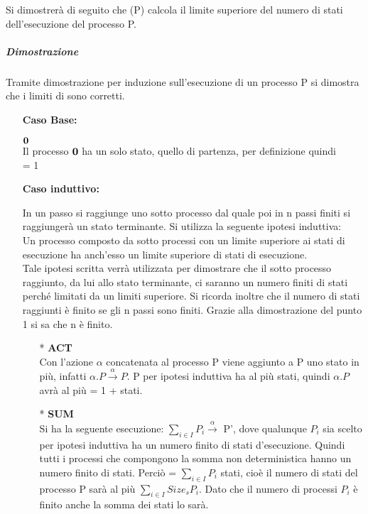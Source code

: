 Si dimostrerà di seguito che \sis(P) calcola il limite superiore del numero di stati dell'esecuzione del processo P.

\subparagraph{Dimostrazione} \mbox{}

Tramite dimostrazione per induzione sull'esecuzione di un processo P si dimostra che i limiti di  sono corretti.

\begin{itemize}
	\item[] \textbf{Caso Base:} \mbox{}
	
	 $\mathbf{0}$
	\\
	Il processo $\mathbf{0}$ ha un solo stato, quello di partenza, per definizione quindi\\ \sis{\zero} = 1 
		\\
	\item[] \textbf{Caso induttivo:} \mbox{}
	
	In un passo si raggiunge uno sotto processo dal quale poi in n passi finiti si raggiungerà un stato terminante. Si utilizza la seguente ipotesi induttiva: \\
	Un processo composto da sotto processi con un limite superiore ai stati di esecuzione ha anch'esso un limite superiore di stati di esecuzione.\\
	Tale ipotesi scritta verrà utilizzata per dimostrare che il sotto processo raggiunto, da lui allo stato terminante, ci saranno un numero finiti di stati perché limitati da un limiti superiore. Si ricorda inoltre che il numero di stati raggiunti è finito se gli n passi sono finiti. Grazie alla dimostrazione del punto 1 si sa che n è finito.
	\\
	\begin{itemize}
		
		\item[*] \textbf{ACT}
		\\
		Con l'azione $\alpha$ concatenata al processo P viene aggiunto a P uno stato in più, infatti $\alpha.P \overset{\alpha}\rightarrow P$. P per ipotesi induttiva ha al più  stati, quindi $\alpha.P$ avrà al più  = 1 +  stati.
		\\
		\item[*] \textbf{SUM}
		\\
		Si ha la seguente esecuzione: $\displaystyle\sum_{i\in I}^{}P_{i} \overset{\alpha}\rightarrow$ P', dove qualunque $P_{i}$ sia scelto per ipotesi induttiva ha un numero finito di stati d'esecuzione. Quindi tutti i processi che compongono la somma non deterministica hanno un numero finito di stati.
		Perciò  = $\displaystyle\sum_{i\in I}^{}P_{i}$ stati, cioè il numero di stati del processo P sarà al più $\displaystyle\sum_{i\in I}^{}Size_{s}{P_{i}}$. Dato che il numero di processi $P_{i}$ è finito anche la somma dei stati lo sarà.
		

\end{itemize}
\end{itemize}
